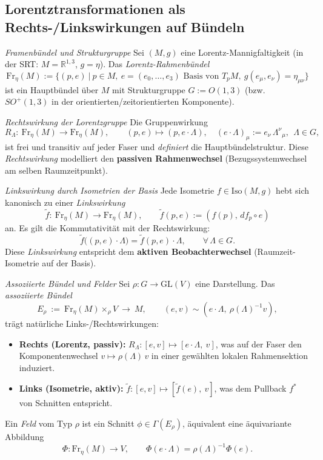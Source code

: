 \documentclass[10pt, letterpaper]{article}
\newcommand{\Iso}{\mathrm{Iso}}
\newcommand{\GL}{\mathrm{GL}}
\begin{document}
\pagebreak
\subsection{Lorentztransformationen als Rechts-/Linkswirkungen auf Bündeln}

\emph{Framenbündel und Strukturgruppe}
Sei $(M,g)$ eine Lorentz-Mannigfaltigkeit (in der SRT: $M=\mathbb{R}^{1,3}$, $g=\eta$).
Das \emph{Lorentz-Rahmenbündel}
\[
\mathrm{Fr}_\eta(M)
:=\bigl\{(p,e)\ \big|\ p\in M,\ e=(e_0,\dots,e_3)\text{ Basis von }T_pM,\ g(e_\mu,e_\nu)=\eta_{\mu\nu}\bigr\}
\]
ist ein Hauptbündel über $M$ mit Strukturgruppe $G:=O(1,3)$ (bzw.\ $SO^+(1,3)$ in der orientierten/zeitorientierten Komponente).


\emph{Rechtswirkung der Lorentzgruppe}
Die Gruppenwirkung
\[
R_\Lambda:\ \mathrm{Fr}_\eta(M)\to\mathrm{Fr}_\eta(M),\qquad
(p,e)\mapsto(p,e\cdot\Lambda),\quad (e\cdot\Lambda)_\mu:=e_\nu\,\Lambda^\nu{}_\mu,\ \ \Lambda\in G,
\]
ist frei und transitiv auf jeder Faser und \emph{definiert} die Hauptbündelstruktur. 
Diese \emph{Rechtswirkung} modelliert den \textbf{passiven Rahmenwechsel} (Bezugssystemwechsel am selben Raumzeitpunkt).


\emph{Linkswirkung durch Isometrien der Basis}
Jede Isometrie $f\in\Iso(M,g)$ hebt sich kanonisch zu einer \emph{Linkswirkung}
\[
\tilde f:\ \mathrm{Fr}_\eta(M)\to\mathrm{Fr}_\eta(M),\qquad
\tilde f(p,e):=(f(p),\,df_p\circ e)
\]
an. Es gilt die Kommutativität mit der Rechtswirkung:
\[
\tilde f\big((p,e)\cdot\Lambda\big)=\tilde f(p,e)\cdot\Lambda,\qquad \forall\,\Lambda\in G.
\]
Diese \emph{Linkswirkung} entspricht dem \textbf{aktiven Beobachterwechsel} (Raumzeit-Isometrie auf der Basis).


\emph{Assoziierte Bündel und Felder}
Sei $\rho:G\to\GL(V)$ eine Darstellung. Das \emph{assoziierte Bündel}
\[
E_\rho\ :=\ \mathrm{Fr}_\eta(M)\times_\rho V\ \longrightarrow\ M,\qquad
(e,v)\sim(e\cdot\Lambda,\ \rho(\Lambda)^{-1}v),
\]
trägt natürliche Links-/Rechtswirkungen:
\begin{itemize}
  \item \textbf{Rechts (Lorentz, passiv):} $R_\Lambda:[e,v]\mapsto[e\cdot\Lambda,\ v]$, was auf der Faser den Komponentenwechsel $v\mapsto \rho(\Lambda)\,v$ in einer gewählten lokalen Rahmensektion induziert.
  \item \textbf{Links (Isometrie, aktiv):} $\tilde f:[e,v]\mapsto[\tilde f(e),\ v]$, was dem Pullback $f^*$ von Schnitten entspricht.
\end{itemize}
Ein \emph{Feld} vom Typ $\rho$ ist ein Schnitt $\phi\in\Gamma(E_\rho)$, äquivalent eine äquivariante Abbildung
\[
\Phi:\mathrm{Fr}_\eta(M)\to V,\qquad \Phi(e\cdot\Lambda)=\rho(\Lambda)^{-1}\Phi(e).
\]
\end{document}
